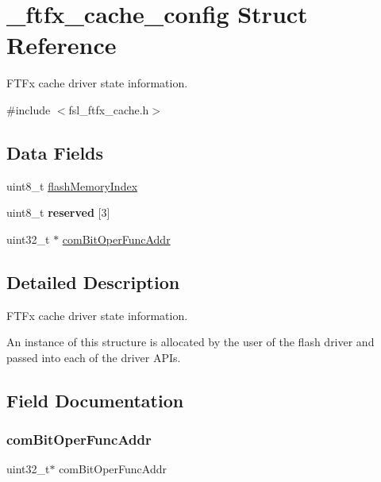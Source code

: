 \hypertarget{struct__ftfx__cache__config}{}\section{\+\_\+ftfx\+\_\+cache\+\_\+config Struct Reference}
\label{struct__ftfx__cache__config}


F\+T\+Fx cache driver state information.  




{\ttfamily \#include $<$fsl\+\_\+ftfx\+\_\+cache.\+h$>$}

\subsection*{Data Fields}
\begin{DoxyCompactItemize}
\item 
uint8\+\_\+t \mbox{\hyperlink{struct__ftfx__cache__config_a678cbdcc5f6a13f253734d0ab489aee0}{flash\+Memory\+Index}}
\item 
\mbox{\label{struct__ftfx__cache__config_a72aca6ea6d8153b28ea8f139b932ec3e}} 
uint8\+\_\+t {\bfseries reserved} \mbox{[}3\mbox{]}
\item 
uint32\+\_\+t $\ast$ \mbox{\hyperlink{struct__ftfx__cache__config_a62b0fcfa77889ff9d140e135a38c2af8}{com\+Bit\+Oper\+Func\+Addr}}
\end{DoxyCompactItemize}


\subsection{Detailed Description}
F\+T\+Fx cache driver state information. 

An instance of this structure is allocated by the user of the flash driver and passed into each of the driver A\+P\+Is. 

\subsection{Field Documentation}
\mbox{\label{struct__ftfx__cache__config_a62b0fcfa77889ff9d140e135a38c2af8}} 
\subsubsection{\texorpdfstring{comBitOperFuncAddr}{comBitOperFuncAddr}}
{\footnotesize\ttfamily uint32\+\_\+t$\ast$ com\+Bit\+Oper\+Func\+Addr}

